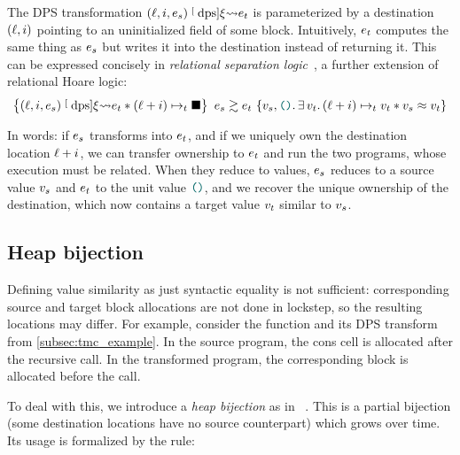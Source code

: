 The DPS transformation $(\datalangLoc, \datalangIdx, \datalangExpr_s) \tmcDps{\datalangRenaming} \datalangExpr_t$ is parameterized by a destination $(\datalangLoc, \datalangIdx)$ pointing to an uninitialized field of some block.
Intuitively, $\datalangExpr_t$ computes the same thing as $\datalangExpr_s$ but writes it into the destination instead of returning it. This can be expressed concisely in \emph{relational separation logic}~\citep*{yang-07}, a further extension of relational Hoare logic:
\[
    \iSimvHoare{
        (\datalangLoc, \datalangIdx, \datalangExpr_s) \tmcDps{\datalangRenaming} \datalangExpr_t \iSep
        (\datalangLoc + \datalangIdx) \iPointsto_t \datalangHole
    }{
        \datalangVal_s, \datalangUnit \ldotp
        \exists \datalangVal_t \ldotp
        (\datalangLoc + \datalangIdx) \iPointsto_t \datalangVal_t \iSep
        \datalangVal_s \iSimilar \datalangVal_t
    }{
        \datalangExpr_s
    }{
        \datalangExpr_t
    }
\]

In words: if $\datalangExpr_s$ transforms into $\datalangExpr_t$, and if we uniquely own the destination location $\datalangLoc + \datalangIdx$, we can transfer ownership to $\datalangExpr_t$ and run the two programs, whose execution must be related. When they reduce to values, $\datalangExpr_s$ reduces to a source value $\datalangVal_s$ and $\datalangExpr_t$ to the unit value $\datalangUnit$, and we recover the unique ownership of the destination, which now contains a target value $\datalangVal_t$ similar to $\datalangVal_s$.

\subsection{Heap bijection}

Defining value similarity as just syntactic equality is not sufficient: corresponding source and target block allocations are not done in lockstep, so the resulting locations may differ.
For example, consider the  function and its DPS transform from \cref{subsec:tmc_example}.
In the source program, the cons cell  is allocated after the recursive call.
In the transformed program, the corresponding block is allocated before the call.

To deal with this, we introduce a \emph{heap bijection} as in \Simuliris~\citep*{simuliris-2022}.
This is a partial bijection (some destination locations have no source counterpart) which grows over time.
Its usage is formalized by the  rule:


